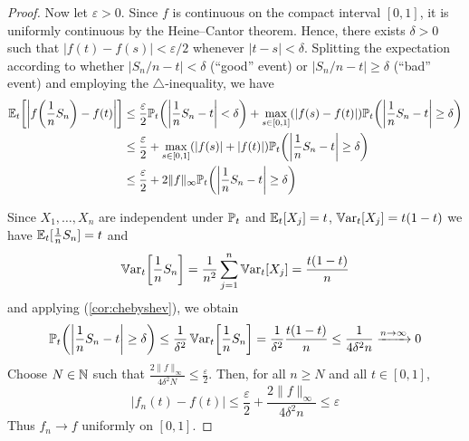 \begin{proof}
Now let $\varepsilon > 0$.
Since $f$ is continuous on the compact interval $[0,1]$, it is uniformly continuous by the Heine--Cantor theorem.
Hence, there exists $\delta > 0$ such that $|f(t)-f(s)| < \varepsilon/2$ whenever $|t-s| < \delta$.
Splitting the expectation according to whether $|S_n/n - t| < \delta$ (``good'' event) or $|S_n/n - t| \geq \delta$ (``bad'' event) and employing the $\triangle$-inequality, we have
\[
\begin{aligned}
\operatorname{\mathbb{E}}_t \biggl[\biggl|f\biggl(\frac{1}{n} S_n \biggr) - f(t)\biggr|\biggr]
&\leq
\frac{\varepsilon}{2} \mathbb{P}_t\biggl(\biggl|\frac{1}{n} S_n - t\biggr| < \delta\biggr)
+
\max_{s \in [0,1]}(|f(s)-f(t)|) \mathbb{P}_t\biggl(\biggl|\frac{1}{n} S_n - t\biggr| \geq \delta\biggr)
\\
&\leq
\frac{\varepsilon}{2} 
+
\max_{s \in [0,1]}(|f(s)|+|f(t)|) \mathbb{P}_t\biggl(\biggl|\frac{1}{n} S_n - t\biggr| \geq \delta\biggr)
\\
&\leq
\frac{\varepsilon}{2} 
+
2 \|f\|_{\infty} \mathbb{P}_t\biggl(\biggl|\frac{1}{n} S_n - t\biggr| \geq \delta\biggr)
\end{aligned}
\]

Since $X_1,\ldots,X_n$ are independent under $\mathbb{P}_t$ and
\(
\operatorname{\mathbb{E}}_t[X_j]=t
\),
\(
\operatorname{\mathbb{V}ar}_t[X_j]=t(1-t)
\)
we have
\(
\operatorname{\mathbb{E}}_t[\frac{1}{n}S_n]=t
\)
and
\[
\operatorname{\mathbb{V}ar}_t\biggl[\frac{1}{n}S_n\biggr]
=
\frac{1}{n^2}\sum_{j=1}^n \operatorname{\mathbb{V}ar}_t[X_j]
=
\frac{t(1-t)}{n}
\]
and applying  (\autoref{cor:chebyshev}), we obtain
\[
\mathbb{P}_t\biggl(\biggl|\frac{1}{n} S_n - t\biggr| \geq \delta\biggr)
\leq
\frac{1}{\delta^2}\operatorname{\mathbb{V}ar}_t\biggl[\frac{1}{n} S_n\biggr]
=
\frac{1}{\delta^2}\frac{t(1-t)}{n}
\leq
\frac{1}{4\delta^2 n}
\xrightarrow{n \to \infty}
0
\]
Choose $N \in \mathbb{N}$ such that
\(
\frac{2\|f\|_{\infty}}{4\delta^2 N}
\leq
\frac{\varepsilon}{2}
\).
Then, for all $n\geq N$ and all $t\in[0,1]$,
\[
|f_n(t)-f(t)|
\leq
\frac{\varepsilon}{2}
+
\frac{2 \|f\|_{\infty}}{4\delta^2 n}
\leq
\varepsilon
\]
Thus $f_n \to f$ uniformly on $[0,1]$.
\end{proof} 


